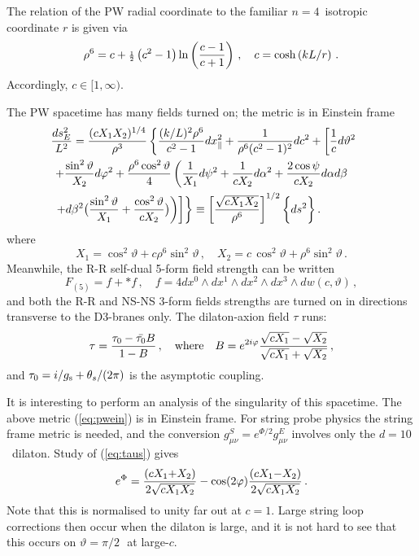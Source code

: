\documentclass[a4paper,12pt]{amsproc}
\numberwithin{equation}{section}
\def\half{\mbox{\scriptsize{${{1}\over{2}}$}}}
\def\gs{g_{\rm{s}}}
\def\nef{$n{=}4$}
\def\detn{$d{=}10$}
\def\vtpt{$\vartheta=\pi/2$\,}
\begin{document}
The relation of the PW radial coordinate to the familiar \nef\
isotropic coordinate $r$ is given via
%
\begin{equation}
\rho^6=c+\half\left(c^2-1\right)\ln\left({{c-1}\over{c+1}}\right) 
\,,\quad
c=\cosh\left(kL/r\right) \,.
\end{equation}
%
Accordingly, $c\in[1,\infty)$.

The PW spacetime has many fields turned on; the metric is in Einstein
frame
%
\begin{equation}\label{eq:pwein}
\begin{split}
&\! {{ds_E^2}\over{L^2}} =
{{(cX_1X_2)^{1/4}}\over{\rho^3}}
\left\{
   {{(k/L)^2\rho^6}\over{c^2-1}}dx_\parallel^2 
   +{{1}\over{\rho^6(c^2-1)^2}}dc^2 + 
   \left[ 
      {{1}\over{c}}d\vartheta^2 
   \right.
\right. 
\cr &\! 
\left.
   \left.
      +{{\sin^2\vartheta}\over{X_2}}d\varphi^2 
      +{{\rho^6\cos^2\vartheta}\over{4}} 
      \left(
         {{1}\over{X_1}}d\psi^2 + {{1}\over{cX_2}}d\alpha^2
         +{{2\cos\psi}\over{cX_2}}d\alpha d\beta 
      \right. 
   \right.
\right. 
\cr &\!
\left.
   \left.
      \left.
         +d\beta^2\bigl({{\sin^2\vartheta}\over{X_1}}
                        +{{\cos^2\vartheta}\over{cX_2}}\bigr) 
      \right)
   \right] 
\right\} 
\equiv 
\left[{{\sqrt{cX_1X_2}}\over{\rho^6}}\right]
^{1/2}\biggl\{ ds^2 \biggr\} \,.
\end{split}
\end{equation}
%
where
%
\begin{equation}
X_1=\cos^2\vartheta+c\rho^6\sin^2\vartheta \,,\quad
X_2=c\,\cos^2\vartheta+\rho^6\sin^2\vartheta \,.
\end{equation}
%
Meanwhile, the R-R self-dual 5-form field strength can be
written
%
\begin{equation}
F_{(5)}=f+*f \,,\quad f = 4dx^0\wedge dx^1\wedge dx^2\wedge dx^3
\wedge dw(c,\vartheta) \,,
\end{equation}
%
and both the R-R and NS-NS 3-form fields strengths are turned on in
directions transverse to the D3-branes only.  The dilaton-axion field
$\tau$ runs:
%
\begin{equation}\label{eq:taus}
\tau = {{\tau_0-{\bar{\tau_0}}B}\over{1-B}} \,, 
\quad{\rm where}\quad B = e^{2i\varphi} 
{{\sqrt{cX_1}-\sqrt{X_2}}\over{\sqrt{cX_1}+\sqrt{X_2}}} \,,
\end{equation}
%
and $\tau_0=i/\gs+\theta_s/(2\pi)$ is the asymptotic coupling.  

It is interesting to perform an analysis of the singularity of this
spacetime.  The above metric (\ref{eq:pwein}) is in Einstein frame.
For string probe physics the string frame metric is needed, and the
conversion $g^S_{\mu\nu}=e^{\Phi/2}g^E_{\mu\nu}$ involves only the
\detn\ dilaton.  Study of (\ref{eq:taus}) gives
%
\begin{equation}
e^\Phi = {{(cX_1{+}X_2)}\over{2\sqrt{cX_1X_2}}}-
\cos(2\varphi){{(cX_1{-}X_2)}\over{2\sqrt{cX_1X_2}}} \,.
\end{equation}
%
Note that this is normalised to unity far out at $c=1$.  Large string
loop corrections then occur when the dilaton is large, and it is not
hard to see that this occurs on \vtpt\ at large-$c$.
\end{document}
